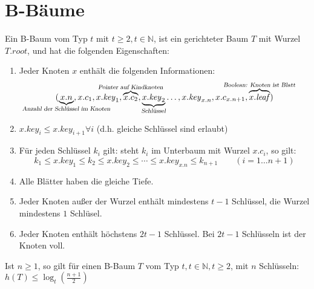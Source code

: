\section{B-Bäume}

\begin{definition}

    Ein B-Baum vom Typ $t$ mit $t \geq 2, t \in \mathbb{N}$, ist ein
    gerichteter Baum $T$ mit Wurzel $T.\mathit{root}$, und hat die folgenden
    Eigenschaften:
    \begin{enumerate}
        \item Jeder Knoten $x$ enthält die folgenden Informationen:
            $$ (\underbrace{x.n}_{\mathclap{\textsl{Anzahl der Schlüssel im
            Knoten}}}, x.c_1, x.\mathit{key}_1,
            \overbrace{x.c_2}^{\mathclap{\textsl{Pointer auf Kindknoten}}},
            \underbrace{x.\mathit{key}_2}_{\mathclap{\textsl{Schlüssel}}}
            \dots, x.\mathit{key}_{x.n}, x.c_{x.n+1},
            \overbrace{x.\mathit{leaf}}^{\mathclap{\textsl{Boolean: Knoten ist
            Blatt}}}) $$

        \item $x.\mathit{key}_i \leq x.\mathit{key}_{i+1} \forall i$ \qquad
        (d.h. gleiche Schlüssel sind erlaubt)

        \item Für jeden Schlüssel $k_i$ gilt: steht $k_i$ im Unterbaum mit
        Wurzel $x.c_i$, so gilt: $$k_1 \leq x.\mathit{key}_1 \leq k_2 \leq
        x.\mathit{key}_2 \leq \cdots \leq x.\mathit{key}_{x.n} \leq k_{n+1}
        \qquad (i=1 \dots n+1)$$

        \item Alle Blätter haben die gleiche Tiefe.

        \item Jeder Knoten außer der Wurzel enthält mindestens $t-1$ Schlüssel,
        die Wurzel mindestens $1$ Schlüsel.

        \item Jeder Knoten enthält höchstens $2t-1$ Schlüssel. Bei $2t-1$
        Schlüsseln ist der Knoten voll.
    \end{enumerate}
\end{definition}


\begin{lemma}

    Ist $n \geq 1$, so gilt für einen B-Baum $T$ vom Typ $t, t \in \mathbb{N},
    t \geq 2$, mit $n$ Schlüsseln: $h(T) \leq \log_t(\frac{n+1}{2})$
\end{lemma}



